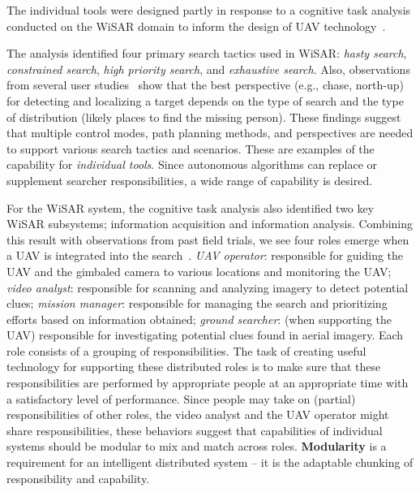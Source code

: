 \documentclass[letterpaper]{article}
\begin{document}
The individual tools were designed partly in response to a cognitive task analysis conducted on the WiSAR domain to inform the design of UAV technology~\cite{adams2009cognitive}.
 
The analysis identified four primary search tactics used in WiSAR: \textit{hasty search}, \textit{constrained search}, \textit{high priority search}, and \textit{exhaustive search}. Also, observations from several user studies~\cite{cooper2008combine} show that the best perspective (e.g., chase, north-up) for detecting and localizing a target depends on the type of search and the type of distribution (likely places to find the missing person). These findings suggest that multiple control modes, path planning methods, and perspectives are needed to support various search tactics and scenarios. These are examples of the capability for \textit{individual tools}. Since autonomous algorithms can replace or supplement searcher responsibilities, a wide range of capability is desired.

For the WiSAR system, the cognitive task analysis also identified two key WiSAR subsystems; information acquisition and information analysis. Combining this result with observations from past field trials, we see four roles emerge when a UAV is integrated into the search~\cite{goodrich2008supporting}. \textit{UAV operator}: responsible for guiding the UAV and the gimbaled camera to various locations and monitoring the UAV; \textit{video analyst}: responsible for scanning and analyzing imagery to detect potential clues; \textit{mission manager}: responsible for managing the search and prioritizing efforts based on information obtained; \textit{ground searcher}: (when supporting the UAV) responsible for investigating potential clues found in aerial imagery. Each role consists of a grouping of responsibilities. The task of creating useful technology for supporting these distributed roles is to make sure that these responsibilities are performed by appropriate people at an appropriate time with a satisfactory level of performance. Since people may take on (partial) responsibilities of other roles, the video analyst and the UAV operator might share responsibilities, these behaviors suggest that capabilities of individual systems should be modular to mix and match across roles. \textbf{Modularity} is a requirement for an intelligent distributed system -- it is the adaptable chunking of responsibility and capability.
\end{document}
